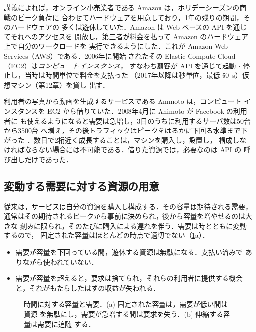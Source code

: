 \documentclass[../main.tex]{subfiles}
\begin{document}
講義によれば，オンライン小売業者である Amazon は，ホリデーシーズンの商戦のピーク負荷に
合わせてハードウェアを用意しており，1年の残りの期間，そのハードウェアの
多くは遊休していた．Amazon は Web ベースの API を通じてそれへのアクセスを
開放し，第三者が料金を払って Amazon のハードウェア上で自分のワークロードを
実行できるようにした．これが Amazon Web Services（AWS）である．2006年に開始
されたその Elastic Compute Cloud（EC2）は\emph{コンピュートインスタンス}，
すなわち顧客が API を通じて起動・停止し，当時は時間単位で料金を支払った
（2017年以降は秒単位，最低 \SI{60}{\second}）仮想マシン（第12章）を貸し
出す．

利用者の写真から動画を生成するサービスである Animoto は，コンピュート
インスタンスを EC2 から借りていた．2008年4月に Animoto が Facebook の利用者に
も使えるようになると需要は急増し，3日のうちに利用するサーバ数は50台から3500台
へ増え，その後トラフィックはピークをはるかに下回る水準まで下がった
\cite{armbrust2009}．数日で2桁近く成長することは，マシンを購入し，設置し，
構成しなければならない場合には不可能である．借りた資源では，必要なのは API の
呼び出しだけであった．

\subsection{変動する需要に対する資源の用意}

従来は，サービスは自分の資源を購入し構成する．その容量は期待される需要，
通常はその期待されるピークから事前に決められ，後から容量を増やせるのは大きな
刻みに限られ，そのたびに購入による遅れを伴う．需要は時とともに変動するので，
固定された容量はほとんどの時点で適切でない（\cref{fig:l16-capacity}a）．
\begin{itemize}
  \item 需要が容量を下回っている間，遊休する資源は無駄になる．支払い済みで
    ありながら使われていない．
  \item 需要が容量を超えると，要求は捨てられ，それらの利用者に提供する機会
    と，それがもたらしたはずの収益が失われる．
\end{itemize}

\begin{figure}[htbp]
  \centering
  
  \caption{時間に対する容量と需要．(a) 固定された容量は，需要が低い間は資源
    を無駄にし，需要が急増する間は要求を失う．(b) 伸縮する容量は需要に追随
    する．}
  \label{fig:l16-capacity}
\end{figure}
\end{document}
